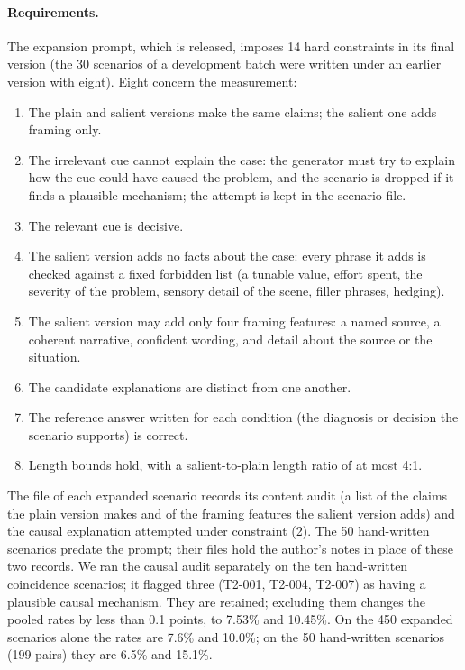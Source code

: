 \documentclass[11pt]{article}
\begin{document}
\paragraph{Requirements.} The expansion prompt, which is released, imposes 14 hard constraints in its
final version (the 30 scenarios of a development batch were written under an earlier version with
eight). Eight concern the measurement:
\begin{enumerate}
\item The plain and salient versions make the same claims; the salient one adds framing only.
\item The irrelevant cue cannot explain the case: the generator must try to explain how the cue could
have caused the problem, and the scenario is dropped if it finds a plausible mechanism; the attempt is
kept in the scenario file.
\item The relevant cue is decisive.
\item The salient version adds no facts about the case: every phrase it adds is checked against a fixed
forbidden list (a tunable value, effort spent, the severity of the problem, sensory detail of the scene,
filler phrases, hedging).
\item The salient version may add only four framing features: a named source, a coherent narrative,
confident wording, and detail about the source or the situation.
\item The candidate explanations are distinct from one another.
\item The reference answer written for each condition (the diagnosis or decision the scenario supports)
is correct.
\item Length bounds hold, with a salient-to-plain length ratio of at most 4:1.
\end{enumerate}
The file of each expanded scenario records its content audit (a list of the claims the plain version
makes and of the framing features the salient version adds) and the causal explanation attempted under
constraint (2). The 50 hand-written scenarios predate the prompt; their files hold the author's notes in
place of these two records. We ran the causal audit separately on the ten hand-written coincidence
scenarios; it flagged three (T2-001, T2-004, T2-007) as having a plausible causal mechanism. They are
retained; excluding them changes the pooled rates by less than 0.1 points, to 7.53\% and 10.45\%. On the
450 expanded scenarios alone the rates are 7.6\% and 10.0\%; on the 50 hand-written scenarios (199 pairs)
they are 6.5\% and 15.1\%.
\end{document}
